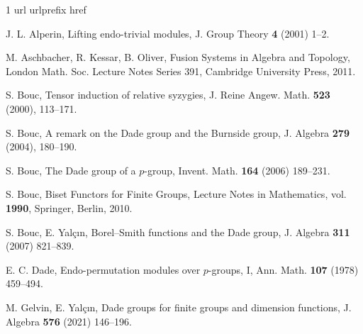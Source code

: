 \documentclass[preprint,12pt,3p]{elsarticle}
\begin{document}
\begin{thebibliography}{1}
	\expandafter\ifx\csname url\endcsname\relax
	\def\url#1{\texttt{#1}}\fi
	\expandafter\ifx\csname urlprefix\endcsname\relax\def\urlprefix{URL }\fi
	\expandafter\ifx\csname href\endcsname\relax
	\def\href#1#2{#2} \def\path#1{#1}\fi
	
	
	J. L. Alperin, Lifting endo-trivial modules, J. Group Theory {\bf 4} (2001) 1--2.
	
	M. Aschbacher, R. Kessar, B. Oliver, Fusion Systems in Algebra and Topology, London Math. Soc. Lecture Notes Series 391, Cambridge University Press, 2011.
	
	S. Bouc, Tensor induction of relative syzygies, J. Reine Angew. Math. {\bf 523} (2000), 113--171.

	S. Bouc, A remark on the Dade group and the Burnside group, J. Algebra {\bf 279} (2004), 180--190.
	
	S. Bouc, The Dade group of a $p$-group, Invent. Math. {\bf 164} (2006) 189--231.

	S. Bouc, Biset Functors for Finite Groups, Lecture Notes in Mathematics, vol. {\bf 1990}, Springer, Berlin, 2010.

	S. Bouc, E. Yal\c{c}\i n, Borel--Smith functions and the Dade group,
	J. Algebra {\bf 311} (2007) 821--839.
	
	
	
	
	
	
	
	
	
	
	
	
	E. C. Dade, Endo-permutation modules over $p$-groups, I, Ann. Math. {\bf107} (1978) 459--494.

	M. Gelvin, E. Yal\c{c}\i n, Dade groups for finite groups and dimension functions, J. Algebra {\bf 576} (2021) 146--196.
	


\end{thebibliography}
\end{document}

